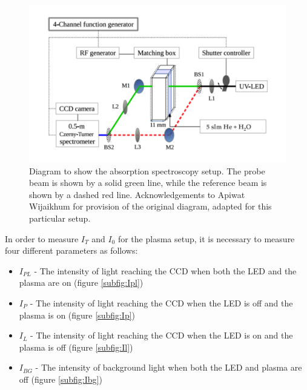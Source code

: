 \documentclass[11pt, oneside]{article}   	%
\begin{document}
\begin{figure}
	\includegraphics[width=\textwidth]{Figures/SetupfromApiwat}
	\caption{Diagram to show the absorption spectroscopy setup. The probe beam is shown by a solid green line, while the reference beam is shown by a dashed red line. Acknowledgements to Apiwat Wijaikhum for provision of the original diagram, adapted for this particular setup.}
	\label{fig:Setup}
\end{figure} 


In order to measure $I_T$ and $I_0$ for the plasma setup, it is necessary to measure four different parameters as follows:
\begin{itemize}
    \item $I_{PL}$ - The intensity of light reaching the CCD when both the LED and the plasma are on (figure \ref{subfig:Ipl})
    \item $I_{P}$ - The intensity of light reaching the CCD when the LED is off and the plasma is on (figure \ref{subfig:Ip})
    \item $I_L$ - The intensity of light reaching the CCD when the LED is on and the plasma is off (figure \ref{subfig:Il})
    \item $I_{BG}$ - The intensity of background light when both the LED and plasma are off (figure \ref{subfig:Ibg})
\end{itemize}
\end{document}
